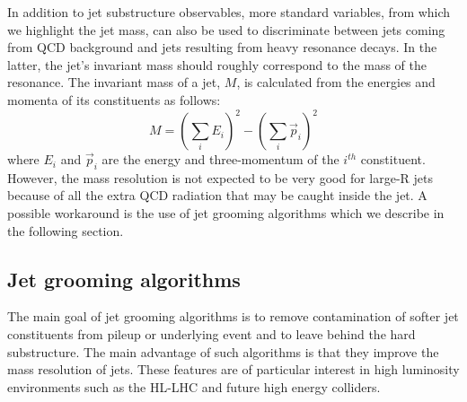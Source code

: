 In addition to jet substructure observables, more standard variables, from which we highlight the jet mass, can also be used to discriminate between jets coming from QCD background and jets resulting from heavy resonance decays. In the latter, the jet's invariant mass should roughly correspond to the mass of the resonance. The invariant mass of a jet, $M$, is  calculated from the energies and momenta of its constituents as follows:
\begin{equation}
	M=\left(\sum_{i}E_i\right)^2-\left(\sum_{i}\vec{p}_i\right)^2
\end{equation}
where $E_i$ and $\vec{p}_i$ are the energy and three-momentum of the $i^{th}$ constituent. However, the mass resolution is not expected to be very good for large-R jets because of all the extra QCD radiation that may be caught inside the jet. A possible workaround is the use of jet grooming algorithms which we describe in the following section.

\subsection{Jet grooming algorithms}
\label{section:jet_groom}

The main goal of jet grooming algorithms is to remove contamination of softer jet constituents from pileup or underlying event and to leave behind the hard substructure. The main advantage of such algorithms is that they improve the mass resolution of jets. These features are of particular interest in high luminosity environments such as the HL-LHC and future high energy colliders. 

